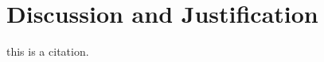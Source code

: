 
\chapter{Discussion and Justification} %

\label{chapter5} %

this is a citation. \autocite{fraislCitizenScienceEnvironmental2022}